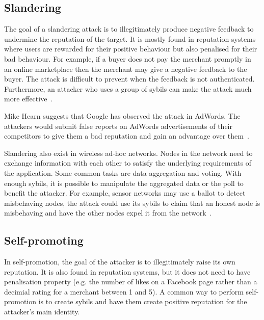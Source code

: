 \subsection{Slandering}
The goal of a slandering attack is to illegitimately produce negative feedback
to undermine the reputation of the target. It is mostly found in reputation
systems where users are rewarded for their positive behaviour but also penalised
for their bad behaviour. For example, if a buyer does not pay the merchant
promptly in an online marketplace then the merchant may give a negative feedback
to the buyer. The attack is difficult to prevent when the feedback is not
authenticated. Furthermore, an attacker who uses a group of sybils can make the
attack much more effective~\cite{hoffman2009survey}.

Mike Hearn suggests that Google has observed the attack in AdWords. The
attackers would submit false reports on AdWords advertisements of their
competitors to give them a bad reputation and gain an advantage over
them~\cite{adwords}.

Slandering also exist in wireless ad-hoc networks. Nodes in the network need to
exchange information with each other to satisfy the underlying requirements of
the application. Some common tasks are data aggregation and voting. With enough
sybils, it is possible to manipulate the aggregated data or the poll to benefit
the attacker. For example, sensor networks may use a ballot to detect
misbehaving nodes, the attack could use its sybils to claim that an honest node
is misbehaving and have the other nodes expel it from the
network~\cite{newsome2004sybil}.

\subsection{Self-promoting}
In self-promotion, the goal of the attacker is to illegitimately raise its own
reputation. It is also found in reputation systems, but it does not need to have
penalisation property (e.g. the number of likes on a Facebook page rather than a
decimial rating for a merchant between 1 and 5). A common way to perform
self-promotion is to create sybils and have them create positive reputation for
the attacker's main identity.

\begin{comment}
Dini and Spagnolo studied the economics of buying reputation on eBay. The
authors discovered many cheap items (around \euro{0.7}) for sell are simply there to
boost feedback. For example, one of the item is titled ``Apple Cranberry Crisp
Recipe + 100\% Positive Feedback''. The authors successfully boosted their
feedback by purchasing such items. But they made an unsuccessful attempted to
place a bid on their own good with a fake account~\cite{dini2009buying}.
\end{comment}

